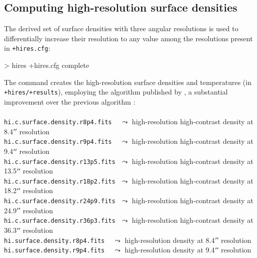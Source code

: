 \documentclass[a4paper,10pt]{article}
\newcommand*{\arcsec}{^{\prime\prime}\mkern-1.2mu}
\begin{document}
\subsection{Computing high-resolution surface densities}
\label{derivation}

The derived set of surface densities with three angular resolutions is used to differentially increase their resolution to any
value among the resolutions present in \verb!+hires.cfg!:
\begin{verbnobox}[\mbox{}\small]
> hires +hires.cfg complete
\end{verbnobox}
The command creates the high-resolution surface densities and temperatures (in \verb!+hires/+results!), employing the algorithm
published by \cite{Men'shchikov2021getsf}, a substantial improvement over the previous algorithm \citep{Palmeirim_etal2013}:\\
\vspace{-2mm}\noindent\\
{\small\verb!hi.c.surface.density.r8p4.fits !} $\,\,\leadsto$ high-resolution high-contrast density at 8.4$\arcsec$ resolution\\
{\small\verb!hi.c.surface.density.r9p4.fits !} $\,\,\leadsto$ high-resolution high-contrast density at 9.4$\arcsec$ resolution\\
{\small\verb!hi.c.surface.density.r13p5.fits!} $\,\,\leadsto$ high-resolution high-contrast density at 13.5$\arcsec$ resolution\\
{\small\verb!hi.c.surface.density.r18p2.fits!} $\,\,\leadsto$ high-resolution high-contrast density at 18.2$\arcsec$ resolution\\
{\small\verb!hi.c.surface.density.r24p9.fits!} $\,\,\leadsto$ high-resolution high-contrast density at 24.9$\arcsec$ resolution\\
{\small\verb!hi.c.surface.density.r36p3.fits!} $\,\,\leadsto$ high-resolution high-contrast density at 36.3$\arcsec$ resolution\\
{\small\verb!hi.surface.density.r8p4.fits !} $\,\,\leadsto$ high-resolution density at 8.4$\arcsec$ resolution\\
{\small\verb!hi.surface.density.r9p4.fits !} $\,\,\leadsto$ high-resolution density at 9.4$\arcsec$ resolution\\
\end{document}
